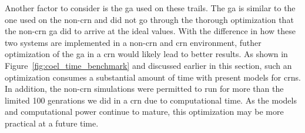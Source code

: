 Another factor to consider is the \gls{ga} used on these trails. The \gls{ga} is similar to the one used on the non-\gls{crn} and did not go through the thorough optimization that the non-\gls{crn} \gls{ga} did to arrive at the ideal values. With the difference in how these two systems are implemented in a non-\gls{crn} and \gls{crn} environment, futher optimization of the \gls{ga} in a \gls{crn} would likely lead to better results. As shown in Figure~\ref{fig:coel_time_benchmark} and discussed earlier in this section,  such an optimization consumes a substantial amount of time with present models for \glspl{crn}. In addition, the non-\gls{crn} simulations were permitted to run for more than the limited 100 genrations we did in a \gls{crn} due to computational time. As the models and computational power continue to mature, this optimization may be more practical at a future time.
